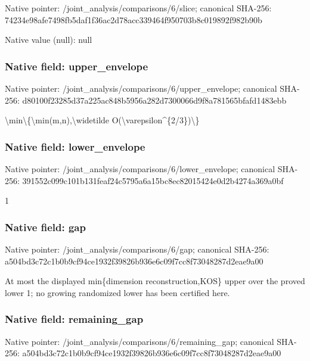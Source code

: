 \documentclass[10pt,a4paper]{article}
\begin{document}
Native pointer: /joint\_analysis/comparisons/6/slice; canonical SHA-256: 74234e98afe7498fb5daf1f3\allowbreak{}6ac2d78acc339464f950703b\allowbreak{}8c019892f982b90b



Native value (null): null



\subsubsection{Native field: upper\_envelope}


Native pointer: /joint\_analysis/comparis\allowbreak{}ons/6/upper\_envelope; canonical SHA-256: d80100f23285d37a225ac848\allowbreak{}b5956a282d7300066d9f8a78\allowbreak{}1565bfafd1483ebb


\textbackslash{}min\textbackslash{}\{\textbackslash{}min(m,n),\textbackslash{}widetilde O(\textbackslash{}varepsilon\textasciicircum{}\{2/3\})\textbackslash{}\}


\subsubsection{Native field: lower\_envelope}


Native pointer: /joint\_analysis/comparis\allowbreak{}ons/6/lower\_envelope; canonical SHA-256: 391552c099c101b131feaf24\allowbreak{}c5795a6a15bc8ec82015424e\allowbreak{}0d2b4274a369a0bf


1


\subsubsection{Native field: gap}


Native pointer: /joint\_analysis/comparisons/6/gap; canonical SHA-256: a504bd3c72c1b0b9cf94ce19\allowbreak{}32f39826b936e6c09f7cc8f7\allowbreak{}3048287d2eae9a00


At most the displayed min\{dimension reconstruction,KOS\} upper over the proved lower 1; no growing randomized lower has been certified here.


\subsubsection{Native field: remaining\_gap}


Native pointer: /joint\_analysis/comparis\allowbreak{}ons/6/remaining\_gap; canonical SHA-256: a504bd3c72c1b0b9cf94ce19\allowbreak{}32f39826b936e6c09f7cc8f7\allowbreak{}3048287d2eae9a00
\end{document}

